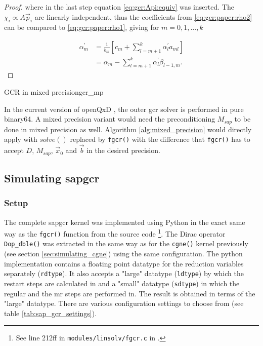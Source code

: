 \documentclass{article}
\theoremstyle{plain} %
\theoremstyle{convention} %
\theoremstyle{remark} %
\def\code#1{\texttt{#1}}
\numberwithin{equation}{section}
\begin{document}
\begin{proof}
where in the last step equation \eqref{eq:gcr:Api:equiv} was inserted. The $\chi_i \propto A \vec{p}_i$ are linearly independent, thus the coefficients from \eqref{eq:gcr:paper:rho2} can be compared to \eqref{eq:gcr:paper:rho1}, giving for $m=0, 1, \dots, k$

\begin{align*}
    \alpha^{\prime}_m &= \frac{1}{b_m} \left[ c_m + \sum_{l=m+1}^k \alpha^{\prime}_l a_{ml} \right] \\
    &= \alpha_m - \sum_{l=m+1}^k \alpha^{\prime}_l \beta_{l-1,m}.
\end{align*} 

\end{proof}

\begin{proposal}{GCR in mixed precision}{gcr_mp}

In the current version of openQxD \cite{openqxd}, the outer \acrshort{gcr} solver is performed in pure \gls{binary64}. A mixed precision variant would need the preconditioning $M_{sap}$ to be done in mixed precision as well. Algorithm \ref{alg:mixed_precision} would directly apply with $solve()$ replaced by \code{fgcr()} with the difference that \code{fgcr()} has to accept $D$, $M_{sap}$, $\vec{x}_0$ and $\vec{b}$ in the desired precision.

\end{proposal}

\subsection{Simulating \acrshort*{sapgcr}}

\label{sec:sap_gcr_results}

\subsubsection{Setup}

The complete \acrshort{sapgcr} kernel was implemented using Python in the exact same way as the \code{fgcr()} function from the source code \footnote{See line 212ff in \code{modules/linsolv/fgcr.c} in \cite{openqxd}.}. The Dirac operator \code{Dop\_dble()} was extracted in the same way as for the \code{cgne()} kernel previously (see section \ref{sec:simulating_cgne}) using the same configuration. The python implementation contains a floating point datatype for the reduction variables separately (\code{rdtype}). It also accepts a "large" datatype (\code{ldtype}) by which the restart steps are calculated in and a "small" datatype (\code{sdtype}) in which the regular and the \acrshort{mr} steps are performed in. The result is obtained in terms of the "large" datatype. There are various configuration settings to choose from (see table \ref{tab:sap_gcr_settings}).
\end{document}
